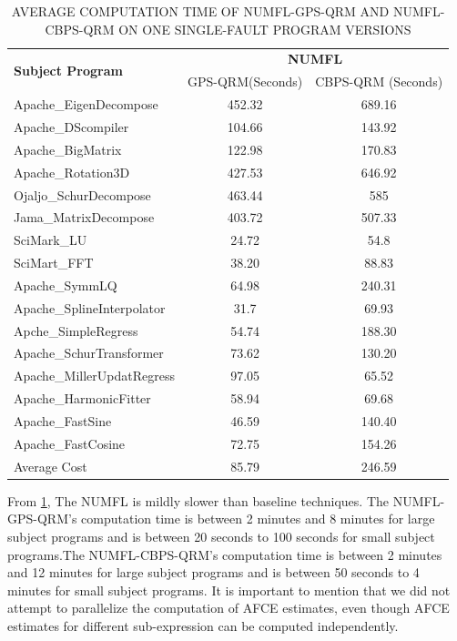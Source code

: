 \begin{table}[htbp!]
\caption{AVERAGE COMPUTATION TIME OF NUMFL-GPS-QRM AND NUMFL-CBPS-QRM ON ONE SINGLE-FAULT PROGRAM VERSIONS }
\label{computetime}
\centering
      \begin{tabular}{|l|c|c|}
      \hline
\multirow{2}{*}{{\bf Subject Program}}	&	\multicolumn{2}{|c|}{{\bf NUMFL}}	\\	\cline{2-3}
  &  GPS-QRM(Seconds) &CBPS-QRM (Seconds)\\ \hline
Apache\_EigenDecompose	&	452.32	&	689.16	\\	\hline
Apache\_DScompiler	&	104.66	&	143.92\\	\hline
Apache\_BigMatrix	&	122.98	&	170.83	\\ \hline
Apache\_Rotation3D	&	427.53	&	646.92	\\	\hline
Ojaljo\_SchurDecompose	&	463.44	&	585	\\	\hline
Jama\_MatrixDecompose	&	403.72	&	507.33	\\	\hline
SciMark\_LU	&	24.72	&	54.8	\\	\hline
SciMart\_FFT	&	38.20	&	88.83	\\	\hline
Apache\_SymmLQ	&	64.98	&	240.31	\\	\hline
Apache\_SplineInterpolator	&	31.7	&	69.93	\\	\hline
Apche\_SimpleRegress	&	54.74	&	188.30	\\	\hline
Apache\_SchurTransformer	&	73.62	&	130.20	\\	\hline
Apache\_MillerUpdatRegress	&	97.05	&	65.52	\\	\hline
Apache\_HarmonicFitter	&	58.94	&	69.68 \\	\hline
Apache\_FastSine	&	46.59	&	140.40	\\ \hline
Apache\_FastCosine	&	72.75	&	154.26	\\	\hline
Average Cost	&	85.79	&	246.59	\\	\hline
\end{tabular}
\end{table}

From \ref{computetime}, The NUMFL is mildly slower than baseline techniques. The NUMFL-GPS-QRM's computation time is between 2 minutes and 8 minutes for large subject programs and is between  20 seconds to 100 seconds for small subject programs.The NUMFL-CBPS-QRM's computation time is between 2 minutes and 12 minutes for large subject programs and is between  50 seconds to 4 minutes for small subject programs. It is important to mention that we did not attempt to parallelize the computation of AFCE estimates, even though AFCE estimates for different sub-expression can be computed independently.

